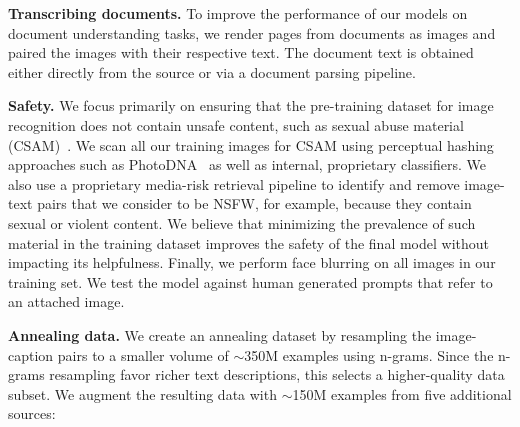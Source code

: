 \textbf{Transcribing documents.} To improve the performance of our models on document understanding tasks, we render pages from documents as images and paired the images with their respective text. The document text is obtained either directly from the source or via a document parsing pipeline.

\textbf{Safety.}
We focus primarily on ensuring that the pre-training dataset for image recognition does not contain unsafe content, such as sexual abuse material (CSAM)~\citep{thiel2023csam}. We scan all our training images for CSAM using perceptual hashing approaches such as PhotoDNA~\citep{farid2021overview} as well as internal, proprietary classifiers. We also use a proprietary media-risk retrieval pipeline to identify and remove image-text pairs that we consider to be NSFW, for example, because they contain sexual or violent content. We believe that minimizing the prevalence of such material in the training dataset improves the safety of the final model without impacting its helpfulness. Finally, we perform face blurring on all images in our training set. We test the model against human generated prompts that refer to an attached image.

\textbf{Annealing data.} We create an annealing dataset by resampling the image-caption pairs to a smaller volume of $\sim$350M examples using n-grams. Since the n-grams resampling favor richer text descriptions, this selects a higher-quality data subset. We augment the resulting data with $\sim$150M examples from five additional sources:

